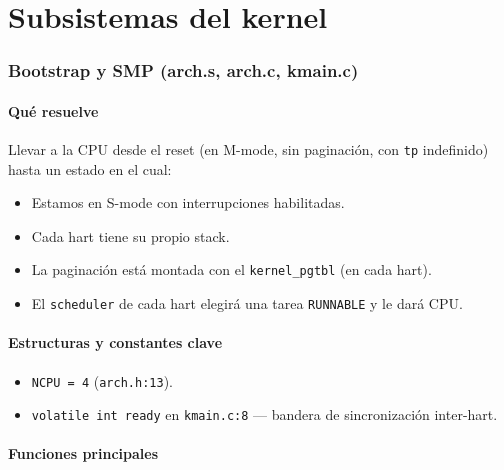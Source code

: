 \documentclass[11pt,a4paper]{article}
\begin{document}
\part{Subsistemas del kernel}

\section{Bootstrap y SMP (arch.s, arch.c, kmain.c)}

\subsection*{Qué resuelve}

Llevar a la CPU desde el reset (en M-mode, sin paginación, con
\texttt{tp} indefinido) hasta un estado en el cual:

\begin{itemize}[nosep,leftmargin=*]
    \item Estamos en S-mode con interrupciones habilitadas.
    \item Cada hart tiene su propio stack.
    \item La paginación está montada con el \texttt{kernel\_pgtbl}
        (en cada hart).
    \item El \texttt{scheduler} de cada hart elegirá una tarea
        \texttt{RUNNABLE} y le dará CPU.
\end{itemize}

\subsection*{Estructuras y constantes clave}

\begin{itemize}[leftmargin=*,nosep]
    \item \texttt{NCPU = 4} (\texttt{arch.h:13}).
    \item \texttt{volatile int ready} en \texttt{kmain.c:8} —
        bandera de sincronización inter-hart.
\end{itemize}

\subsection*{Funciones principales}
\end{document}

